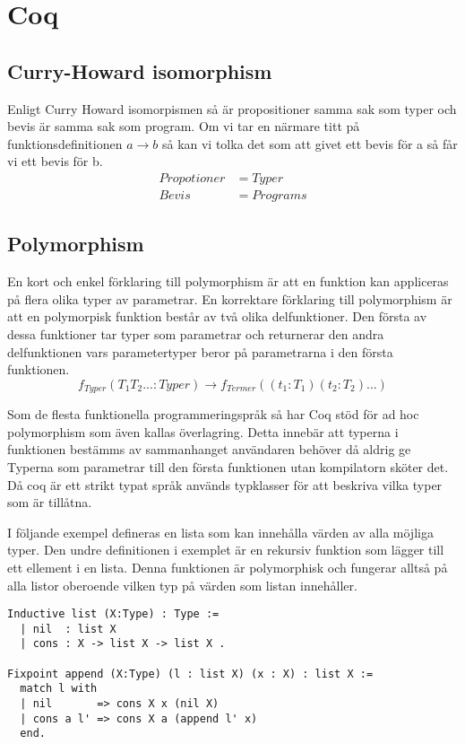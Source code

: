 \section{Coq}

\subsection{Curry-Howard isomorphism}
Enligt Curry Howard isomorpismen så är propositioner samma sak som typer och
bevis är samma sak som program. Om vi tar en närmare titt på
funktionsdefinitionen $a \rightarrow b$ så kan vi tolka det som att givet ett
bevis för a så får vi ett bevis för b.
\begin{align*}
  Propotioner &= Typer \\
  Bevis       &= Programs
\end{align*}

\subsection{Polymorphism}
En kort och enkel förklaring till polymorphism är att en funktion kan appliceras
på flera olika typer av parametrar.
En korrektare förklaring till polymorphism är att en polymorpisk funktion
består av två olika delfunktioner. Den första av dessa funktioner tar
typer som parametrar och returnerar den andra delfunktionen vars parametertyper
beror på parametrarna i den första funktionen.
\begin{equation}
f_{Typer}(T_1 T_2 ... : Typer)
\rightarrow f_{Termer}((t_1 : T_1) (t_2 : T_2) ...)
\end{equation}


Som de flesta funktionella programmeringspråk så har Coq stöd för ad hoc
polymorphism som även kallas överlagring. Detta innebär att typerna i
funktionen bestämms av sammanhanget användaren behöver då aldrig ge
Typerna som parametrar till den första funktionen utan kompilatorn sköter
det.
Då coq är ett strikt typat språk används
typklasser för att beskriva vilka typer som är tillåtna.

I följande exempel defineras en lista som kan innehålla värden av alla möjliga
typer. Den undre definitionen i exemplet är en rekursiv funktion som lägger till
ett ellement i en lista. Denna funktionen är polymorphisk och fungerar alltså på
alla listor oberoende vilken typ på värden som listan innehåller.
\begin{lstlisting}
Inductive list (X:Type) : Type :=
  | nil  : list X
  | cons : X -> list X -> list X .

Fixpoint append (X:Type) (l : list X) (x : X) : list X :=
  match l with
  | nil       => cons X x (nil X)
  | cons a l' => cons X a (append l' x)
  end.
\end{lstlisting}

